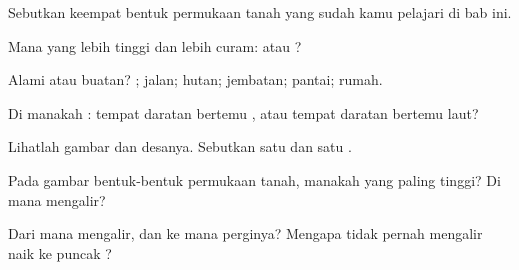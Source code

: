 \begin{exercise}[$\star$]\label{exo:g1:landscapes-around-us:1}
Sebutkan keempat bentuk permukaan tanah yang sudah kamu pelajari di bab ini.
\end{exercise}

\begin{exercise}[$\star$]\label{exo:g1:landscapes-around-us:2}
Mana yang lebih tinggi dan lebih curam:  atau ?
\end{exercise}

\begin{exercise}[$\star$]\label{exo:g1:landscapes-around-us:3}
Alami atau buatan? ; jalan; hutan; jembatan; pantai; rumah.
\end{exercise}

\begin{exercise}[$\star$]\label{exo:g1:landscapes-around-us:4}
Di manakah : tempat daratan bertemu , atau tempat daratan
bertemu laut?
\end{exercise}

\begin{exercise}[$\star$]\label{exo:g1:landscapes-around-us:5}
Lihatlah gambar  dan desanya. Sebutkan satu  dan
satu .
\end{exercise}

\begin{exercise}[$\star$]\label{exo:g1:landscapes-around-us:6}
Pada gambar bentuk-bentuk permukaan tanah,  manakah yang
paling tinggi? Di mana  mengalir?
\end{exercise}

\begin{exercise}[$\star\star$]\label{exo:g1:landscapes-around-us:7}
Dari mana  mengalir, dan ke mana perginya? Mengapa  tidak
pernah mengalir naik ke puncak ?
\end{exercise}


